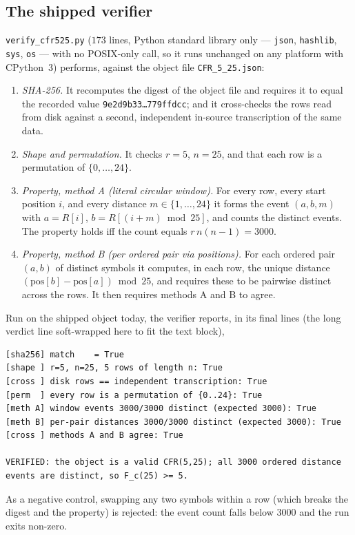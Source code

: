 \documentclass[11pt]{amsart}
\theoremstyle{plain}
\theoremstyle{definition}
\theoremstyle{remark}
\begin{document}
\subsection*{The shipped verifier}
\texttt{verify\_cfr525.py} ($173$ lines, Python standard library only ---
\texttt{json}, \texttt{hashlib}, \texttt{sys}, \texttt{os} --- with no
POSIX-only call, so it runs unchanged on any platform with CPython~3) performs,
against the object file \texttt{CFR\_5\_25.json}:
\begin{enumerate}
\item \emph{SHA-256.} It recomputes the digest of the object file and requires
it to equal the recorded value
\texttt{9e2d9b33\ldots779ffdcc}; and it cross-checks the rows read from disk
against a second, independent in-source transcription of the same data.
\item \emph{Shape and permutation.} It checks $r=5$, $n=25$, and that each row
is a permutation of $\{0,\dots,24\}$.
\item \emph{Property, method A (literal circular window).} For every row,
every start position $i$, and every distance $m\in\{1,\dots,24\}$ it forms the
event $(a,b,m)$ with $a=R[i]$, $b=R[(i+m)\bmod 25]$, and counts the distinct
events. The property holds iff the count equals $r\,n(n-1)=3000$.
\item \emph{Property, method B (per ordered pair via positions).} For each
ordered pair $(a,b)$ of distinct symbols it computes, in each row, the unique
distance $(\mathrm{pos}[b]-\mathrm{pos}[a])\bmod 25$, and requires these to be
pairwise distinct across the rows. It then requires methods A and B to agree.
\end{enumerate}
Run on the shipped object today, the verifier reports, in its final
lines (the long verdict line soft-wrapped here to fit the text block),
\begin{verbatim}
[sha256] match    = True
[shape ] r=5, n=25, 5 rows of length n: True
[cross ] disk rows == independent transcription: True
[perm  ] every row is a permutation of {0..24}: True
[meth A] window events 3000/3000 distinct (expected 3000): True
[meth B] per-pair distances 3000/3000 distinct (expected 3000): True
[cross ] methods A and B agree: True

VERIFIED: the object is a valid CFR(5,25); all 3000 ordered distance
events are distinct, so F_c(25) >= 5.
\end{verbatim}
As a negative control, swapping any two symbols within a row (which breaks the
digest and the property) is rejected: the event count falls below $3000$ and
the run exits non-zero.
\end{document}
